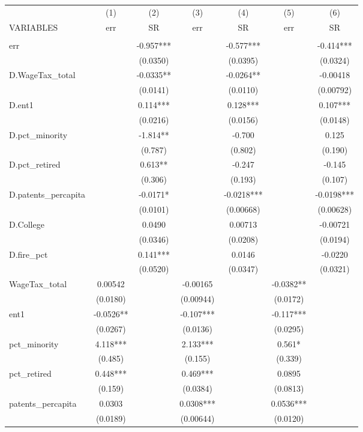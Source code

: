 \begin{tabular}{lcccccc} \hline
 & (1) & (2) & (3) & (4) & (5) & (6) \\
VARIABLES & err & SR & err & SR & err & SR \\ \hline
 &  &  &  &  &  &  \\
err &  & -0.957*** &  & -0.577*** &  & -0.414*** \\
 &  & (0.0350) &  & (0.0395) &  & (0.0324) \\
D.WageTax\_total &  & -0.0335** &  & -0.0264** &  & -0.00418 \\
 &  & (0.0141) &  & (0.0110) &  & (0.00792) \\
D.ent1 &  & 0.114*** &  & 0.128*** &  & 0.107*** \\
 &  & (0.0216) &  & (0.0156) &  & (0.0148) \\
D.pct\_minority &  & -1.814** &  & -0.700 &  & 0.125 \\
 &  & (0.787) &  & (0.802) &  & (0.190) \\
D.pct\_retired &  & 0.613** &  & -0.247 &  & -0.145 \\
 &  & (0.306) &  & (0.193) &  & (0.107) \\
D.patents\_percapita &  & -0.0171* &  & -0.0218*** &  & -0.0198*** \\
 &  & (0.0101) &  & (0.00668) &  & (0.00628) \\
D.College &  & 0.0490 &  & 0.00713 &  & -0.00721 \\
 &  & (0.0346) &  & (0.0208) &  & (0.0194) \\
D.fire\_pct &  & 0.141*** &  & 0.0146 &  & -0.0220 \\
 &  & (0.0520) &  & (0.0347) &  & (0.0321) \\
WageTax\_total & 0.00542 &  & -0.00165 &  & -0.0382** &  \\
 & (0.0180) &  & (0.00944) &  & (0.0172) &  \\
ent1 & -0.0526** &  & -0.107*** &  & -0.117*** &  \\
 & (0.0267) &  & (0.0136) &  & (0.0295) &  \\
pct\_minority & 4.118*** &  & 2.133*** &  & 0.561* &  \\
 & (0.485) &  & (0.155) &  & (0.339) &  \\
pct\_retired & 0.448*** &  & 0.469*** &  & 0.0895 &  \\
 & (0.159) &  & (0.0384) &  & (0.0813) &  \\
patents\_percapita & 0.0303 &  & 0.0308*** &  & 0.0536*** &  \\
 & (0.0189) &  & (0.00644) &  & (0.0120) &  \\

\end{tabular}

